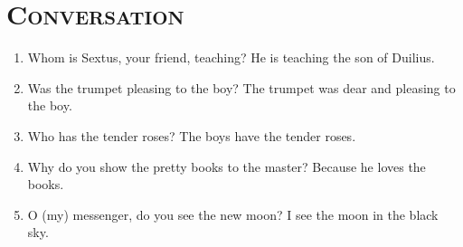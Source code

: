 \documentclass[12pt]{article}
\begin{document}
\section{\textsc{Conversation}}
\begin{enumerate}[1.]
	\item Whom is Sextus, your friend, teaching? He is teaching the son of Duilius.
	\item Was the trumpet pleasing to the boy? The trumpet was dear and pleasing to the boy.
	\item Who has the tender roses? The boys have the tender roses.
	\item Why do you show the pretty books to the master? Because he loves the books.
	\item O (my) messenger, do you see the new moon? I see the moon in the black sky.
\end{enumerate}
\end{document}
